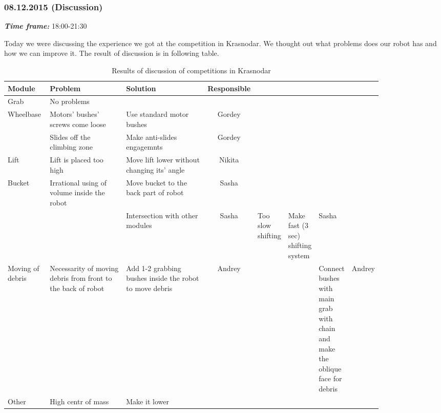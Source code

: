 \subsubsection{08.12.2015 (Discussion)}
\textit{\textbf{Time frame:}} 18:00-21:30

Today we were discussing the experience we got at the competition in Krasnodar. We thought out what problems does our robot has and how we can improve it. The result of discussion is in following table.

\begin{table}[H]
	\caption{Results of discussion of competitions in Krasnodar}
	\label{tabular:meetingKRA12.12}
	\begin{center}
		\begin{tabular}{|p{0.12\linewidth}|p{0.35\linewidth}|p{0.38\linewidth}|c|}
			\hline
			Module & Problem	& Solution	& Responsible \\
			\hline
			Grab	& No problems	& &	\\
			\hline
			Wheelbase &	Motors' bushes' screws come loose &	Use standard motor bushes &	Gordey \\
			& Slides off the climbing zone &	Make anti-slides engagemnts	& Gordey \\
			\hline
			Lift	& Lift is placed too high	& Move lift lower without changing its' angle	& Nikita \\
			\hline
			Bucket	& Irrational using of volume inside the robot &	Move bucket to the back part of robot	& Sasha\\
			& & Intersection with other modules		& Sasha
			& Too slow shifting	& Make fast (3 sec) shifting system	& Sasha \\
			\hline
			Moving of debris &	Necessarity of moving debris from front to the back of robot &	Add 1-2 grabbing bushes inside the robot to move debris	& Andrey &
			& & Connect bushes with main grab with chain and make the oblique face for debris &	Andrey \\
			\hline
			Other	& High centr of mass	& Make it lower	& \\
			\hline
			
		\end{tabular}
	\end{center}
\end{table}
